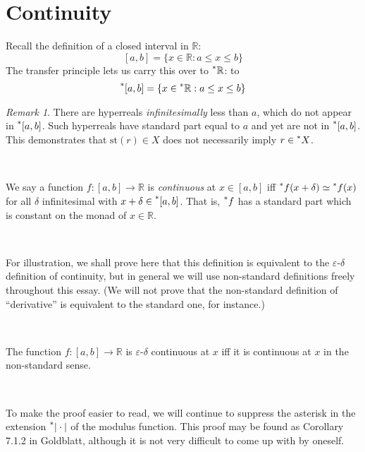 \documentclass[11pt]{amsart}
\theoremstyle{remark}
\newtheorem*{remark}{Remark}
\newcommand{\st}{\mathrm{st}}
\newcommand{\hyp}[1][\mathbb{R}]{\prescript{*}{}{#1}}
\newcommand{\near}{\simeq}
\begin{document}
\section{Continuity}

Recall the definition of a closed interval in $\mathbb{R}$: $$[a, b] = \{ x \in \mathbb{R}: a \leq x \leq b \}$$
The transfer principle lets us carry this over to $\hyp$: to $$\hyp[[]a, b] = \{ x \in \hyp: a \leq x \leq b \}$$

\begin{remark}There are hyperreals \emph{infinitesimally} less than $a$, which do not appear in $\hyp[[]a, b]$.
Such hyperreals have standard part equal to $a$ and yet are not in $\hyp[[]a, b]$.
This demonstrates that $\st(r) \in X$ does not necessarily imply $r \in \hyp[X]$.
\end{remark}

\

\begin{defn}[Continuity] We say a function $f: [a, b] \to \mathbb{R}$ is \emph{continuous} at $x \in [a, b]$ iff $\hyp[f](x+\delta) \near \hyp[f](x)$ for all $\delta$ infinitesimal with $x+\delta \in \hyp[[]a, b]$. That is, $\hyp[f]$ has a standard part which is constant on the monad of $x \in \mathbb{R}$. 
\end{defn}

\

For illustration, we shall prove here that this definition is equivalent to the $\varepsilon$-$\delta$ definition of continuity, but in general we will use non-standard definitions freely throughout this essay.
(We will not prove that the non-standard definition of ``derivative'' is equivalent to the standard one, for instance.)

\

\begin{thm} \label{thm:equivalence_of_continuity} The function $f: [a, b] \to \mathbb{R}$ is $\varepsilon$-$\delta$ continuous at $x$ iff it is continuous at $x$ in the non-standard sense.
\end{thm}

\

To make the proof easier to read, we will continue to suppress the asterisk in the extension $\hyp[|] \cdot |$ of the modulus function.
This proof may be found as Corollary 7.1.2 in Goldblatt, although it is not very difficult to come up with by oneself.
\end{document}
